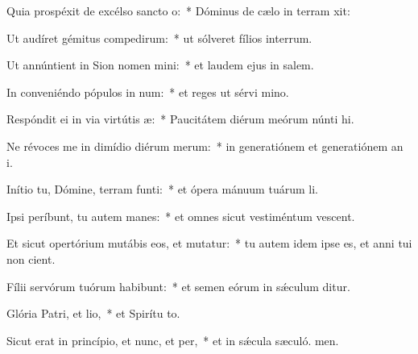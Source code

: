 \item Quia prospéxit de excélso sancto o:~* Dóminus de cælo in terram xit:
\item Ut audíret gémitus compedirum:~* ut sólveret fílios interrum.
\item Ut annúntient in Sion nomen mini:~* et laudem ejus in salem.
\item In conveniéndo pópulos in num:~* et reges ut sérvi mino.
\item Respóndit ei in via virtútis æ:~* Paucitátem diérum meórum núnti hi.
\item Ne révoces me in dimídio diérum merum:~* in generatiónem et generatiónem an i.
\item Inítio tu, Dómine, terram funti:~* et ópera mánuum tuárum  li.
\item Ipsi períbunt, tu autem manes:~* et omnes sicut vestiméntum vescent.
\item Et sicut opertórium mutábis eos, et mutatur:~* tu autem idem ipse es, et anni tui non cient.
\item Fílii servórum tuórum habibunt:~* et semen eórum in sǽculum ditur.
\item Glória Patri, et lio,~* et Spirítu to.
\item Sicut erat in princípio, et nunc, et per,~* et in sǽcula sæculó. men.
